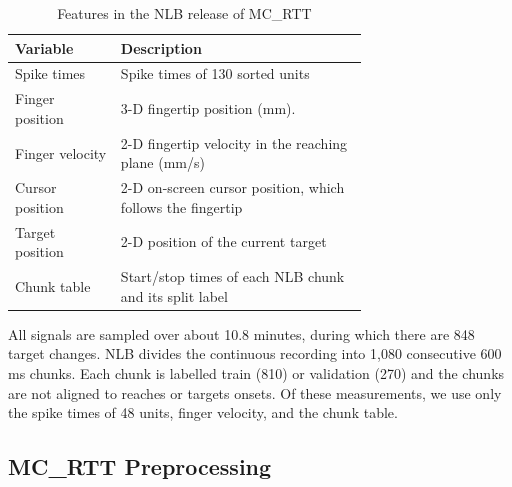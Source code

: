 \documentclass[10pt]{article}
\begin{document}
\begin{table}[ht]
  \centering
  \small
  \caption{Features in the NLB release of MC\_RTT}
  \label{tab:mc_rtt_variables}
  \begin{tabular}{@{}l p{0.7\linewidth}@{}}
    \toprule
    Variable        & Description                                                                                                                                                                                                  \\
    \midrule
    Spike times     & Spike times of 130 sorted units \\
    Finger position & 3-D fingertip position (mm).                                                                                                                                                                                 \\
    Finger velocity & 2-D fingertip velocity in the reaching plane (mm/s)                                                                                   \\
    Cursor position & 2-D on-screen cursor position, which follows the fingertip                                                                                                                                                  \\
    Target position & 2-D position of the current target                                                                                                                                                                          \\
    Chunk table     & Start/stop times of each NLB chunk and its split label                                                                                                                                                    \\
    \bottomrule
  \end{tabular}
\end{table}

All signals are sampled over about 10.8 minutes, during which there are 848 target changes.
NLB divides the continuous recording into 1,080 consecutive 600 ms chunks.
Each chunk is labelled train (810) or validation (270) and the chunks are not aligned to reaches or targets onsets.
Of these measurements, we use only the spike times of 48 units, finger velocity, and the chunk table.

\subsection{MC\_RTT Preprocessing}
\end{document}
